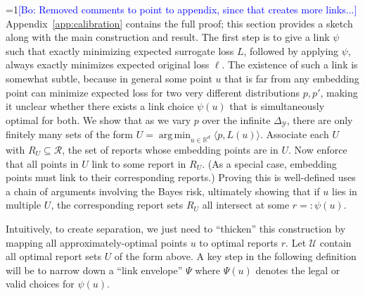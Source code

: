 \documentclass[12pt]{article}
\newcommand{\Comments}{1}
\newcommand{\mynote}[2]{\ifnum\Comments=1\textcolor{#1}{#2}\fi}
\newcommand{\bo}[1]{\mynote{blue}{[Bo: #1]}}
\newcommand{\reals}{\mathbb{R}}
\newcommand{\simplex}{\Delta_\Y}
\newcommand{\R}{\mathcal{R}}
\newcommand{\U}{\mathcal{U}}
\newcommand{\Y}{\mathcal{Y}}
\newcommand{\toto}{\rightrightarrows}
\newcommand{\trim}{\mathrm{trim}}
\DeclareMathOperator*{\argmin}{arg\,min}
\newtheorem{proposition}{Proposition}
\begin{document}
\bo{Removed comments to point to appendix, since that creates more links...}
Appendix~\ref{app:calibration} contains the full proof; this section provides a sketch along with the main construction and result.
The first step is to give a link $\psi$ such that exactly minimizing expected surrogate loss $L$, followed by applying $\psi$, always exactly minimizes expected original loss $\ell$.
The existence of such a link is somewhat subtle, because in general some point $u$ that is far from any embedding point can minimize expected loss for two very different distributions $p,p'$, making it unclear whether there exists a link choice $\psi(u)$ that is simultaneously optimal for both.
We show that as we vary $p$ over the infinite $\simplex$, there are only finitely many sets of the form $U = \argmin_{u \in \reals^d} \langle p, L(u) \rangle$.
Associate each $U$ with $R_U \subseteq \R$, the set of reports whose embedding points are in $U$.
Now enforce that all points in $U$ link to some report in $R_U$.
(As a special case, embedding points must link to their corresponding reports.)
Proving this is well-defined uses a chain of arguments involving the Bayes risk, ultimately showing that if $u$ lies in multiple $U$, the corresponding report sets $R_U$ all intersect at some $r =: \psi(u)$.

%

Intuitively, to create separation, we just need to ``thicken'' this construction by mapping all approximately-optimal points $u$ to optimal reports $r$.
Let $\U$ contain all optimal report sets $U$ of the form above.
A key step in the following definition will be to narrow down a ``link envelope'' $\Psi$ where $\Psi(u)$ denotes the legal or valid choices for $\psi(u)$.
\end{document}
